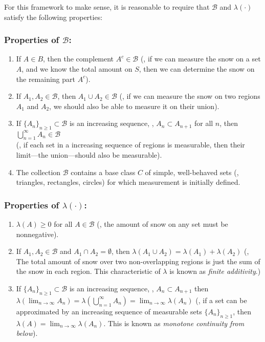 For this framework to make sense, it is reasonable to require that $ \mathcal{B}$ and $\lambda (\cdot)$ satisfy the following properties:

\subsubsection*{Properties of $\mathcal{B}$:}
\begin{enumerate}
    \item If $A \in B$, then the complement $A^c \in \mathcal{B}$ (\ie, if we can measure the snow on a set $A$, and we know the total amount on $S$, then we can determine the snow on the remaining part $A^c$).
    \item If $A_1, A_2 \in \mathcal{B}$, then \(A_1 \cup A_2 \in \mathcal{B}\)  
    (\ie, if we can measure the snow on two regions \(A_1\) and \(A_2\), we should also be able to measure it on their union).
    \item If $\{A_n\}_{n \geq 1} \subset \mathcal{B}$ is an increasing sequence, \ie, $A_n \subset A_{n+1}$ for all $n$, then $\bigcup_{n=1}^{\infty} A_n \in \mathcal{B}$  
    \\(\ie, if each set in a increasing sequence of regions is measurable, then their limit—the union—should also be measurable).
    \item The collection $\mathcal{B}$ contains a base class $C$ of simple, well-behaved sets (\eg, triangles, rectangles, circles) for which measurement is initially defined.
\end{enumerate}

\subsubsection*{Properties of $\lambda (\cdot)$:}
\begin{enumerate}
    \item  $\lambda(A) \geq 0$ for all $A \in \mathcal{B}$ (\ie, the amount of snow on any set must be nonnegative). 
    \item If $A_1, A_2 \in \mathcal{B}$ and $A_1 \cap A_2 = \emptyset$, then  
    $\lambda(A_1 \cup A_2) = \lambda(A_1) + \lambda(A_2)$
 (\ie, The total amount of snow over two non-overlapping regions is just the sum of the snow in each region. This characteristic of 
$\lambda$ is known as \emph{finite additivity}.)
    \item If $\{A_n\}_{n \geq 1} \subset \mathcal{B}$ is an increasing sequence, \ie, $A_n \subset A_{n+1}$ then  
    $
    \lambda( \lim_{n \to \infty} A_n) = \lambda\left( \bigcup_{n=1}^\infty A_n \right) = \lim_{n \to \infty} \lambda(A_n)
    $
    (\ie, if a set can be approximated by an increasing sequence of measurable sets $\{A_n\}_{n \geq 1}$, then $\lambda(A) = \lim_{n \to \infty} \lambda(A_n)$. This is known as \emph{monotone continuity from below}).
\end{enumerate}

